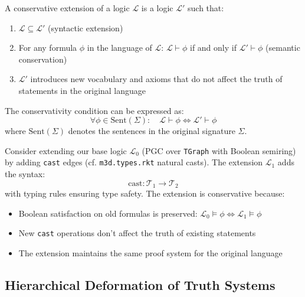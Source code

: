 \begin{definition}
\label{def:conservative-extension}
A conservative extension of a logic $\mathcal{L}$ is a logic $\mathcal{L}'$ such that:
\begin{enumerate}
\item $\mathcal{L} \subseteq \mathcal{L}'$ (syntactic extension)
\item For any formula $\phi$ in the language of $\mathcal{L}$: $\mathcal{L} \vdash \phi$ if and only if $\mathcal{L}' \vdash \phi$ (semantic conservation)
\item $\mathcal{L}'$ introduces new vocabulary and axioms that do not affect the truth of statements in the original language
\end{enumerate}
The conservativity condition can be expressed as:
\[
\forall \phi \in \text{Sent}(\Sigma): \quad \mathcal{L} \vdash \phi \Leftrightarrow \mathcal{L}' \vdash \phi
\]
where $\text{Sent}(\Sigma)$ denotes the sentences in the original signature $\Sigma$.
\end{definition}

\begin{example}
\label{ex:conservative-extension}
Consider extending our base logic $\mathcal{L}_0$ (PGC over \texttt{TGraph} with Boolean semiring) by adding \texttt{cast} edges (cf. \texttt{m3d.types.rkt} natural casts). The extension $\mathcal{L}_1$ adds the syntax:
\[
\text{cast}: \mathcal{T}_1 \to \mathcal{T}_2
\]
with typing rules ensuring type safety. The extension is conservative because:
\begin{itemize}
\item Boolean satisfaction on old formulas is preserved: $\mathcal{L}_0 \models \phi \Leftrightarrow \mathcal{L}_1 \models \phi$
\item New \texttt{cast} operations don't affect the truth of existing statements
\item The extension maintains the same proof system for the original language
\end{itemize}
\end{example}

\subsection{Hierarchical Deformation of Truth Systems}

